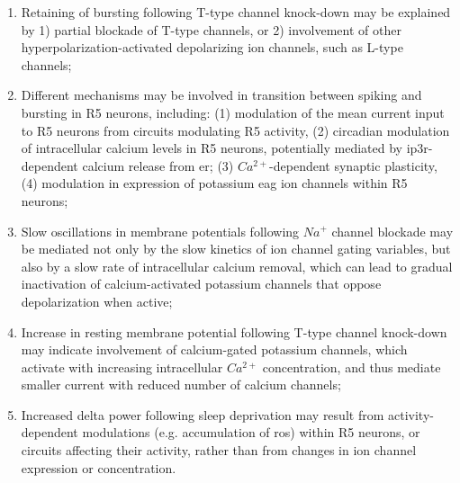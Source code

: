 \documentclass[../main.tex]{subfiles}
\begin{document}
\begin{enumerate}
    \item Retaining of bursting following T-type channel knock-down may be explained by 1) partial blockade of T-type channels, or 2) involvement of other hyperpolarization-activated depolarizing ion channels, such as L-type channels;
    
    \item Different mechanisms may be involved in transition between spiking and bursting in R5 neurons, including: (1) modulation of the mean current input to R5 neurons from circuits modulating R5 activity, (2) circadian modulation of intracellular calcium levels in R5 neurons, potentially mediated by \gls{ip3r}-dependent calcium release from \gls{er}; (3) $Ca^{2+}$-dependent synaptic plasticity, (4) modulation in expression of potassium \gls{eag} ion channels within R5 neurons;
    
    \item Slow oscillations in membrane potentials following $Na^+$ channel blockade may be mediated not only by the slow kinetics of ion channel gating variables, but also by a slow rate of intracellular calcium removal, which can lead to gradual inactivation of calcium-activated potassium channels that oppose depolarization when active;

    \item Increase in resting membrane potential following T-type channel knock-down may indicate involvement of calcium-gated potassium channels, which activate with increasing intracellular $Ca^{2+}$ concentration, and thus mediate smaller current with reduced number of calcium channels;
    
    \item Increased delta power following sleep deprivation may result from activity-dependent modulations (e.g. accumulation of \gls{ros}) within R5 neurons, or circuits affecting their activity, rather than from changes in ion channel expression or concentration.
    
    
\end{enumerate}
\end{document}
